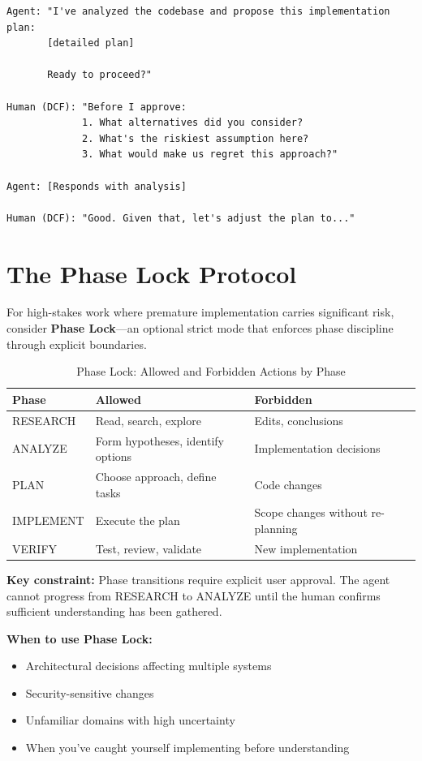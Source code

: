 \begin{lstlisting}
Agent: "I've analyzed the codebase and propose this implementation plan:
       [detailed plan]

       Ready to proceed?"

Human (DCF): "Before I approve:
             1. What alternatives did you consider?
             2. What's the riskiest assumption here?
             3. What would make us regret this approach?"

Agent: [Responds with analysis]

Human (DCF): "Good. Given that, let's adjust the plan to..."
\end{lstlisting}

\section{The Phase Lock Protocol}\label{sec:phase-lock}

For high-stakes work where premature implementation carries significant risk, consider \textbf{Phase Lock}---an optional strict mode that enforces phase discipline through explicit boundaries.

\begin{table}[H]
\centering
\begin{tabular}{lll}
\toprule
\textbf{Phase} & \textbf{Allowed} & \textbf{Forbidden} \\
\midrule
RESEARCH & Read, search, explore & Edits, conclusions \\
ANALYZE & Form hypotheses, identify options & Implementation decisions \\
PLAN & Choose approach, define tasks & Code changes \\
IMPLEMENT & Execute the plan & Scope changes without re-planning \\
VERIFY & Test, review, validate & New implementation \\
\bottomrule
\end{tabular}
\caption{Phase Lock: Allowed and Forbidden Actions by Phase}
\label{tab:phase-lock}
\end{table}

\textbf{Key constraint:} Phase transitions require explicit user approval. The agent cannot progress from RESEARCH to ANALYZE until the human confirms sufficient understanding has been gathered.

\textbf{When to use Phase Lock:}
\begin{itemize}
    \item Architectural decisions affecting multiple systems
    \item Security-sensitive changes
    \item Unfamiliar domains with high uncertainty
    \item When you've caught yourself implementing before understanding
\end{itemize}

